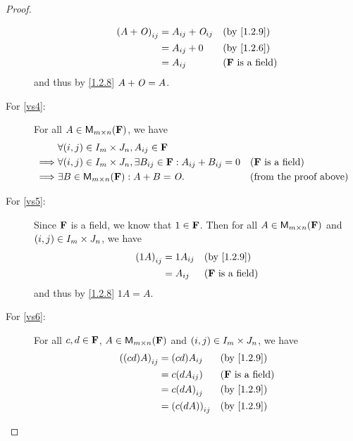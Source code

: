 \begin{proof}
\begin{description}
            \begin{align*}
                \p{A + \zm}_{i j} & = A_{i j} + \zm_{i j} &  & \text{(by \cref{1.2.9})}   \\
                                  & = A_{i j} + 0         &  & \text{(by \cref{1.2.6})}   \\
                                  & = A_{i j}             &  & \text{(\(\F\) is a field)}
            \end{align*}
            and thus by \cref{1.2.8} \(A + \mathit{O} = A\).
        \item[For \ref{vs4}:]
            For all \(A \in {\mathsf{M}_{{m} \times n}({\mathbf{F}})}\), we have
            \begin{align*}
                         & \forall \p{i, j} \in I_{m} \times J_{n}, A_{i j} \in \F                                                                    \\
                \implies & \forall \p{i, j} \in I_{m} \times J_{n}, \exists B_{i j} \in \F : A_{i j} + B_{i j} = 0 &  & \text{(\(\F\) is a field)}    \\
                \implies & \exists B \in \ms{m}{n}{\F} : A + B = \zm.                                              &  & \text{(from the proof above)}
            \end{align*}
        \item[For \ref{vs5}:]
            Since \(\mathbf{F}\) is a field, we know that \(1 \in \mathbf{F}\).
            Then for all \(A \in {\mathsf{M}_{{m} \times n}({\mathbf{F}})}\) and \(\left\lparen i, j\right\rparen \in I_{m} \times J_{n}\), we have
            \begin{align*}
                \p{1A}_{i j} & = 1 A_{i j} &  & \text{(by \cref{1.2.9})}   \\
                             & = A_{i j}   &  & \text{(\(\F\) is a field)}
            \end{align*}
            and thus by \cref{1.2.8} \(1A = A\).
        \item[For \ref{vs6}:]
            For all \(c, d \in \mathbf{F}\), \(A \in {\mathsf{M}_{{m} \times n}({\mathbf{F}})}\) and \(\left\lparen i, j\right\rparen \in I_{m} \times J_{n}\), we have
            \begin{align*}
                \p{\p{cd} A}_{i j} & = \p{cd} A_{i j}      &  & \text{(by \cref{1.2.9})}   \\
                                   & = c \p{d A_{i j}}     &  & \text{(\(\F\) is a field)} \\
                                   & = c \p{d A}_{i j}     &  & \text{(by \cref{1.2.9})}   \\
                                   & = \p{c \p{d A}}_{i j} &  & \text{(by \cref{1.2.9})}

\end{align*}
\end{description}
\end{proof}
